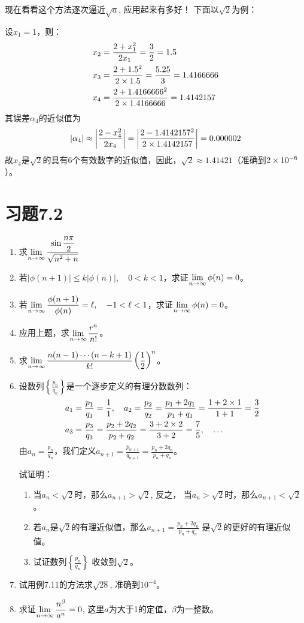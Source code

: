 现在看看这个方法逐次逼近$\sqrt{a}$, 应用起来有多好！
下面以$\sqrt{2}$为例：

设$x_1=1$，则：
\[\begin{split}
    x_2&=\dfrac{2+x^2_1}{2x_1}=\dfrac{3}{2}=1.5\\
    x_3&=\dfrac{2+1.5^2}{2\times 1.5}=\dfrac{5.25}{3}=1.4166666   \\
    x_4&=\dfrac{2+1.4166666^2}{2\times 1.4166666}=1.4142157   \\
\end{split}\]
其误差$\alpha_4$的近似值为
\[|\alpha_4|\approx \left|\dfrac{2-x^2_4}{2x_4}\right|=\left|\dfrac{2-1.4142157^2}{2\times 1.4142157}\right|=0.000002\]
故$x_4$是$\sqrt{2}$的具有6个有效数字的近似值，因此，$\sqrt{2}\approx 1.41421$（准确到$2\times10^{-6}$）。

\section*{习题7.2}

\begin{enumerate}
    \item 求$\displaystyle\lim_{n\to\infty}\dfrac{\sin\dfrac{n\pi}{2}}{\sqrt{n^2+n}} $
\item 若$|\phi(n+1)|\le k|\phi(n)|,\quad 0<k<1$，求证$\displaystyle\lim_{n\to\infty}\phi(n)=0$。
\item 若$\displaystyle\lim_{n\to\infty}\dfrac{\phi(n+1)}{\phi(n)}=\ell,\quad -1<\ell<1$，求证$\displaystyle\lim_{n\to\infty}\phi(n)=0$。
\item 应用上题，求$\displaystyle\lim_{n\to\infty}\dfrac{r^n}{n!}$。
\item 求$\displaystyle\lim_{n\to\infty}\dfrac{n(n-1)\cdots (n-k+1)}{k!}\left(\dfrac{1}{2}\right)^n$。
\item 设数列$\left\{\frac{p_n}{q_n}\right\}$是一个逐步定义的有理分数数列：
\[\begin{split}
    a_1&=\dfrac{p_1}{q_1}=\dfrac{1}{1},\quad a_2=\dfrac{p_2}{q_2}=\dfrac{p_1+2q_1}{p_1+q_1}=\dfrac{1+2\times 1}{1+1}=\dfrac{3}{2}\\
a_3&=\dfrac{p_3}{q_3}=\dfrac{p_2+2q_2}{p_2+q_2}=\dfrac{3+2\times2}{3+2}=\dfrac{7}{5},\quad \ldots
\end{split}\]
由$a_n=\frac{p_n}{q_n}$，我们定义$a_{n+1}=\frac{p_{n+1}}{q_{n+1}}=\frac{p_n+2q_n}{p_n+q_n}$。

试证明： \begin{enumerate}
    \item 当$a_n<\sqrt{2}$时，那么$a_{n+1}>\sqrt{2}$, 反之，
    当$a_n>\sqrt{2}$时，那么$a_{n+1}<\sqrt{2}$。
    \item 若$a_n$是$\sqrt{2}$的有理近似值，那么$a_{n+1}=\frac{p_n+2q_n}{p_n+q_n}$
    是$\sqrt{2}$的更好的有理近似值。
    \item 试证数列$\left\{\frac{p_n}{q_n}\right\}$
   收敛到$\sqrt{2}$。
\end{enumerate}
\item 试用例7.11的方法求$\sqrt{28}$, 准确到$10^{-4}$。
\item 求证$\displaystyle\lim_{n\to\infty}\dfrac{n^{\beta}}{a^n}=0$, 这里$a$为大于1的定值，$\beta$为一整数。
\end{enumerate}

